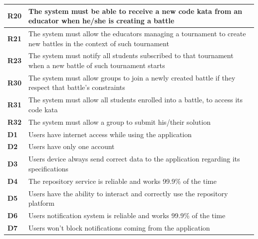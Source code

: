 \documentclass[../RASD.tex]{subfiles}
\begin{document}
\begin{table}[H]
\begin{center}
\begin{tabular}{|m{2em}|m{30em}|}
                \hline
                \cellcolor{ReqMappingCell2}
                \textbf{R20} & The system must be able to receive a new code kata from an educator when he/she is creating a battle\\
                \hline
                \cellcolor{ReqMappingCell2}
                \textbf{R21} & The system must allow the educators managing a tournament to create new battles in the context of such tournament\\
                \hline
                \cellcolor{ReqMappingCell2}
                \textbf{R23} & The system must notify all students subscribed to that tournament when a new battle of such tournament starts\\
                \hline
                \cellcolor{ReqMappingCell2}
                \textbf{R30} & The system must allow groups to join a newly created battle if they respect that battle's constraints\\
                \hline
                \cellcolor{ReqMappingCell2}
                \textbf{R31} & The system must allow all students enrolled into a battle, to access its code kata\\
                \hline
                \cellcolor{ReqMappingCell2}
                \textbf{R32} & The system must allow a group to submit his/their solution\\
                \hline
                \cellcolor{ReqMappingCell3}
                \textbf{D1} & Users have internet access while using the application\\
                \hline
                \cellcolor{ReqMappingCell3}
                \textbf{D2} & Users have only one account\\
                \hline
                \cellcolor{ReqMappingCell3}
                \textbf{D3} & Users device always send correct data to the application regarding its specifications\\
                \hline
                \cellcolor{ReqMappingCell3}
                \textbf{D4} & The repository service is reliable and works 99.9\% of the time\\
                \hline
                \cellcolor{ReqMappingCell3}
                \textbf{D5} & Users have the ability to interact and correctly use the repository platform\\
                \hline
                \cellcolor{ReqMappingCell3}
                \textbf{D6} & Users notification system is reliable and works 99.9\% of the time\\
                \hline
                \cellcolor{ReqMappingCell3}
                \textbf{D7} & Users won't block notifications coming from the application\\
                \hline
                \end{tabular}
            \end{center}
        \end{table}\newpage
\end{document}

